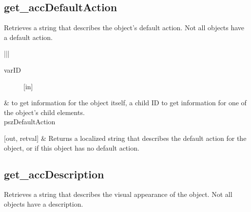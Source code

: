\documentclass[letterpaper,12pt,english,openany,oneside]{sphinxmanual}
\begin{document}
\subsection{get\_accDefaultAction}
\label{\detokenize{MSAA_PDF:get-accdefaultaction}}
Retrieves a string that describes the object’s default action. Not all objects have a default action.

\begin{sphinxVerbatim}[commandchars=\\\{\}]
   
\end{sphinxVerbatim}



\begin{savenotes}\sphinxattablestart
\centering
{}\label{\detokenize{MSAA_PDF:section-6}}\nobreak
\begin{tabular}[t]{|*{2}{|}}
\hline
\begin{description}
\item[{varID}] \leavevmode
{[}in{]}

\end{description}
&
 to get information for the object itself, a child ID to get information for one of the object’s child elements.
\\
\hline
pszDefaultAction

{[}out, retval{]}
&
Returns a localized string that describes the default action for the object, or  if this object has no default action.
\\
\hline
\end{tabular}
\par
\sphinxattableend\end{savenotes}


\begin{sphinxVerbatim}[commandchars=\\\{\}]
\end{sphinxVerbatim}


\subsection{get\_accDescription}
\label{\detokenize{MSAA_PDF:get-accdescription}}
Retrieves a string that describes the visual appearance of the object. Not all objects have a description.
\end{document}
